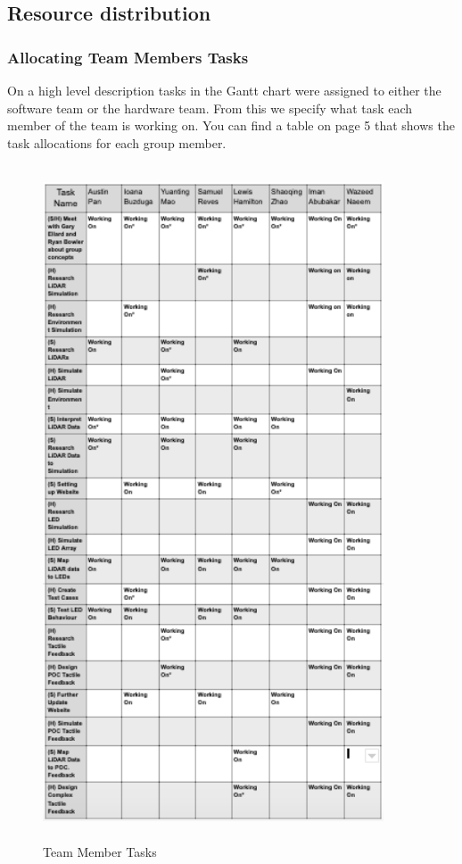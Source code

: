 \documentclass{article}
\begin{document}
\subsection{Resource distribution}
\subsubsection{Allocating Team Members Tasks}
On a high level description tasks in the Gantt chart were assigned to either the software team or the hardware team. From this we specify what task each member of the team is working on.
You can find a table on page 5 that shows the task allocations for each group member.
 \begin{figure}[h]
 \begin{center}
  \includegraphics[width=0.9\textwidth,height=20cm]{TeamMember.png}
   
   \end{center}
  \caption{Team Member Tasks}
\end{figure}
\end{document}
